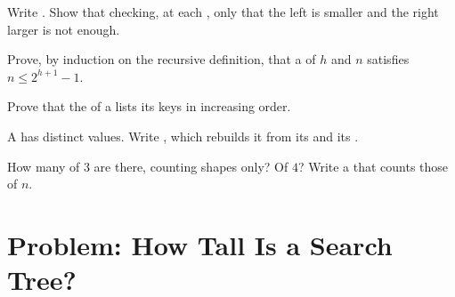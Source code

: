 \begin{exercise}[$\star\star$]\label{exo:g12:trees:11}
Write . Show that checking, at each , only that the left  is smaller and the right 
larger is not enough.
\end{exercise}

\begin{exercise}[$\star\star\star$]\label{exo:g12:trees:12}
Prove, by induction on the recursive definition, that a  of  $h$ and  $n$ satisfies
$n \le 2^{h+1} - 1$.
\end{exercise}

\begin{exercise}[$\star\star\star$]\label{exo:g12:trees:13}
Prove that the   of a  lists its keys in increasing order.
\end{exercise}

\begin{exercise}[$\star\star\star$]\label{exo:g12:trees:14}
A  has distinct values. Write , which rebuilds it from its  and its .
\end{exercise}

\begin{exercise}[$\star\star\star$]\label{exo:g12:trees:15}
How many  of  $3$ are there, counting shapes only? Of  $4$? Write a  that counts
those of  $n$.
\end{exercise}

\section{Problem: How Tall Is a Search Tree?}\label{sec:g12:trees:problem}

